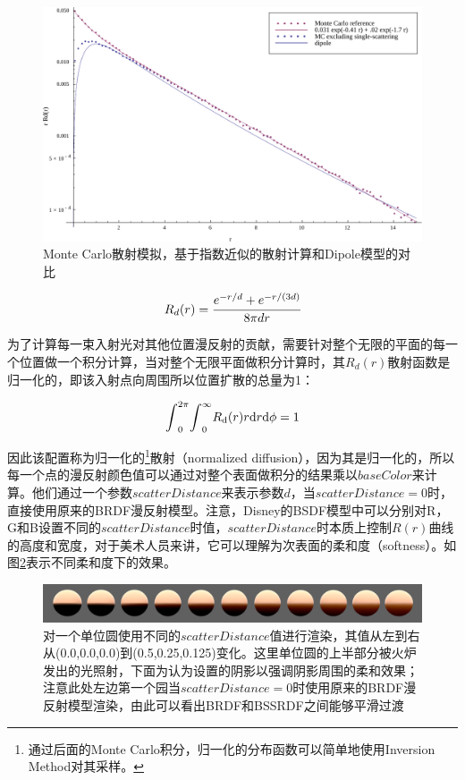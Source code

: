\begin{figure}
	\includegraphics[width=1.\textwidth]{figures/intro/monteCarloFit}
	\caption{Monte Carlo散射模拟，基于指数近似的散射计算和Dipole模型的对比}
	\label{f:intro-bssrdf-r}
\end{figure}

\begin{equation}
	R_d(r)= \cfrac{e^{-r/d}+e^{-r/(3d)}}{8\pi dr}
\end{equation}

\noindent 为了计算每一束入射光对其他位置漫反射的贡献，需要针对整个无限的平面的每一个位置做一个积分计算，当对整个无限平面做积分计算时，其$R_d(r)$散射函数是归一化的，即该入射点向周围所以位置扩散的总量为1：

\begin{equation}
	{\rm \int}^{2\pi}_0{\rm \int}^\infty_0 R_{\rm d}(r)r{\rm d}r{\rm d}\phi=1
\end{equation}

\noindent 因此该配置称为归一化的\footnote{通过后面的Monte Carlo积分，归一化的分布函数可以简单地使用Inversion Method对其采样。}散射（normalized diffusion），因为其是归一化的，所以每一个点的漫反射颜色值可以通过对整个表面做积分的结果乘以$baseColor$来计算。他们通过一个参数$scatterDistance$来表示参数$d$，当$scatterDistance=0$时，直接使用原来的BRDF漫反射模型。注意，Disney的BSDF模型中可以分别对R，G和B设置不同的$scatterDistance$时值，$scatterDistance$时本质上控制$R(r)$曲线的高度和宽度，对于美术人员来讲，它可以理解为次表面的柔和度（softness）。如图\ref{f:intro-bssrdf-sss}表示不同柔和度下的效果。

\begin{figure}
\begin{fullwidth}
	\includegraphics[width=1.\thewidth]{figures/intro/spheres-SSS}
	\caption{对一个单位圆使用不同的$scatterDistance$值进行渲染，其值从左到右从(0.0,0.0,0.0)到(0.5,0.25,0.125)变化。这里单位圆的上半部分被火炉发出的光照射，下面为认为设置的阴影以强调阴影周围的柔和效果；注意此处左边第一个园当$scatterDistance=0$时使用原来的BRDF漫反射模型渲染，由此可以看出BRDF和BSSRDF之间能够平滑过渡}
	\label{f:intro-bssrdf-sss}
\end{fullwidth}
\end{figure}




